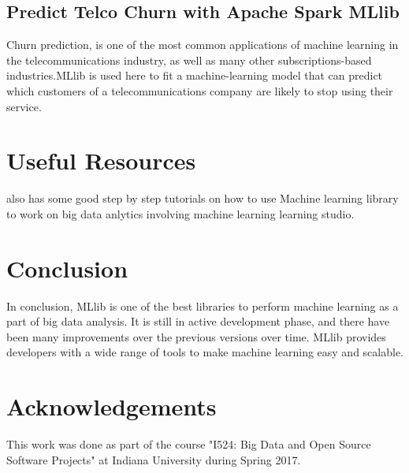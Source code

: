 \documentclass[9pt,twocolumn,twoside]{../../styles/osajnl}
\begin{document}
\subsection{Predict Telco Churn with Apache Spark MLlib}

Churn prediction, is one of the most common applications of machine
learning in the telecommunications industry, as well as many other
subscriptions-based industries.MLlib is used here to fit a
machine-learning model that can predict which customers of a
telecommunications company are likely to stop using their
service.\cite{TelcoChurn}

\section{Useful Resources}

\cite{Machine-Learning-Library-(MLlib-Guide)-website} also
has some good step by step tutorials on how to use Machine learning
library to work on big data anlytics involving machine learning
learning studio.

\section{Conclusion}

In conclusion, MLlib is one of the best libraries to perform machine
learning as a part of big data analysis. It is still in active
development phase, and there have been many improvements over the
previous versions over time. MLlib provides developers with a wide
range of tools to make machine learning easy and scalable.

\section{Acknowledgements}

This work was done as part of the course "I524: Big Data and Open
Source Software Projects" at Indiana University during Spring
2017. 


\end{document}
